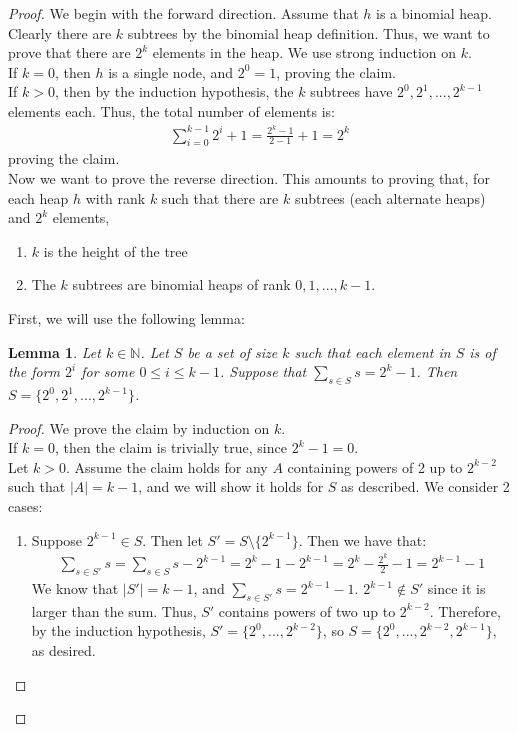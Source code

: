 \documentclass{article}
\newtheorem{lemma}[theorem]{Lemma}
\begin{document}
\begin{proof}
We begin with the forward direction. Assume that $h$ is a binomial heap. Clearly there are $k$ subtrees by the binomial heap definition. Thus, we want to prove that there are $2^k$ elements in the heap. We use strong induction on $k$.
\\If $k=0$, then $h$ is a single node, and $2^0=1$, proving the claim.
\\If $k > 0$, then by the induction hypothesis, the $k$ subtrees have $2^0, 2^1, ..., 2^{k-1}$ elements each. Thus, the total number of elements is:
\begin{align*}
\sum_{i=0}^{k-1} 2^i + 1 = \frac{2^k - 1}{2-1} + 1 = 2^k
\end{align*}
proving the claim.
\\Now we want to prove the reverse direction. This amounts to proving that, for each heap $h$ with rank $k$ such that there are $k$ subtrees (each alternate heaps) and $2^k$ elements, 
\begin{enumerate}
\item
$k$ is the height of the tree
\item
The $k$ subtrees are binomial heaps of rank $0, 1, ..., k-1$.
\end{enumerate}
First, we will use the following lemma:
\begin{lemma}
Let $k\in\mathbb{N}$. Let $S$ be a set of size $k$ such that each element in $S$ is of the form $2^i$ for some $0 \leq i \leq k -1$. Suppose that $\sum_{s \in S} s = 2^k-1$. Then $S=\lbrace 2^0, 2^1,...,2^{k-1}\rbrace$.
\end{lemma}
\begin{proof}
We prove the claim by induction on $k$. 
\\If $k=0$, then the claim is trivially true, since $2^k -1 = 0$.
\\Let $k > 0$. Assume the claim holds for any $A$ containing powers of 2 up to $2^{k-2}$ such that $|A|= k-1$, and we will show it holds for $S$ as described. We consider 2 cases:
\begin{enumerate}
\item
Suppose $2^{k-1} \in S$. Then let $S' = S\setminus \lbrace 2^{k-1} \rbrace$. Then we have that:
\begin{align*}
\sum_{s\in S'} s = \sum_{s\in S} s - 2^{k-1} = 2^k-1-2^{k-1} = 2^k-\frac{2^k}{2} - 1 = 2^{k-1} - 1
\end{align*}
We know that $|S'| = k - 1$, and $\sum_{s\in S'} s = 2^{k-1} - 1$. $2^{k-1} \notin S'$ since it is larger than the sum. Thus, $S'$ contains powers of two up to $2^{k-2}$. Therefore, by the induction hypothesis, $S' = \lbrace 2^0, ..., 2^{k-2}\rbrace$, so $S = \lbrace 2^0, ..., 2^{k-2}, 2^{k-1}\rbrace$, as desired.

\end{enumerate}
\end{proof}
\end{proof}
\end{document}
